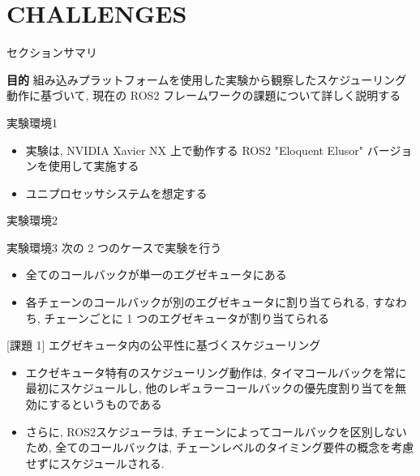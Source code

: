 
\section{CHALLENGES}
\label{sec: challenges}

\begin{frame}{セクションサマリ}
    \begin{itembox}[l]{\textbf{目的}}
        組み込みプラットフォームを使用した実験から観察したスケジューリング動作に基づいて, 現在の ROS2 フレームワークの課題について詳しく説明する
    \end{itembox}
\end{frame}

\begin{frame}{実験環境1}
    \begin{itemize}
        \item 実験は, NVIDIA Xavier NX 上で動作する ROS2 "Eloquent Elusor" バージョンを使用して実施する
        \item ユニプロセッサシステムを想定する
    \end{itemize}
\end{frame}

\begin{frame}[label=exampleChain]{実験環境2}
\end{frame}

\begin{frame}{実験環境3}
    次の 2 つのケースで実験を行う
    \begin{itemize}
        \item 全てのコールバックが単一のエグゼキュータにある
        \item 各チェーンのコールバックが別のエグゼキュータに割り当てられる, すなわち, チェーンごとに 1 つのエグゼキュータが割り当てられる
    \end{itemize}
\end{frame}

\begin{frame}{[課題 1] エグゼキュータ内の公平性に基づくスケジューリング}
    \begin{itemize}
        \item エクゼキュータ特有のスケジューリング動作は, タイマコールバックを常に最初にスケジュールし, 他のレギュラーコールバックの優先度割り当てを無効にするというものである
        \item さらに, ROS2スケジューラは, チェーンによってコールバックを区別しないため, 全てのコールバックは, チェーンレベルのタイミング要件の概念を考慮せずにスケジュールされる.
    \end{itemize}
\end{frame}

